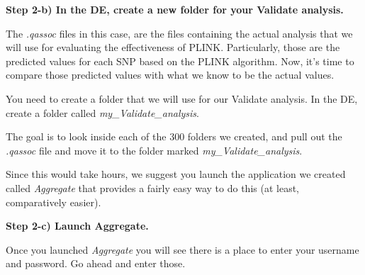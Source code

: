 \documentclass[twoside,a4paper]{refart}
\begin{document}
\newpage
\begin{center}
\end{center}

\textbf{Step 2-b) In the DE, create a new folder for your Validate analysis.}

The \textit{.qassoc} files in this case, are the files containing the actual analysis that we will use for evaluating the effectiveness of PLINK. Particularly, those are the predicted values for each SNP based on the PLINK algorithm. Now, it's time to compare those predicted values with what we know to be the actual values. 

You need to create a folder that we will use for our Validate analysis. In the DE, create a folder called \textit{my\_Validate\_analysis}. 

The goal is to look inside each of the 300 folders we created, and pull out the \textit{.qassoc} file and move it to the folder marked \textit{my\_Validate\_analysis}. 

Since this would take hours, we suggest you launch the application we created called \textit{Aggregate} that provides a fairly easy way to do this (at least, comparatively easier). 

\textbf{Step 2-c) Launch Aggregate.}  

Once you launched \textit{Aggregate} you will see there is a place to enter your username and password. Go ahead and enter those. 
\end{document}
